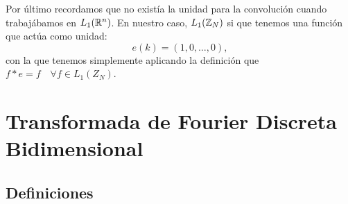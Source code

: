 \documentclass{article}
\begin{document}
Por último recordamos que no existía la unidad para la convolución cuando trabajábamos en $L_1(\mathbb{R}^n)$. En nuestro caso, $L_1(\mathbb{Z}_N)$ si que tenemos una función que actúa como unidad:
\[
e(k)=(1,0,\dots,0),
\]
con la que tenemos simplemente aplicando la definición que $f \ast e=f \quad \forall f \in L_1(Z_N)$. 

\newpage

\section{Transformada de Fourier Discreta Bidimensional} \label{sec:dft:2}

\subsection{Definiciones}
\end{document}
